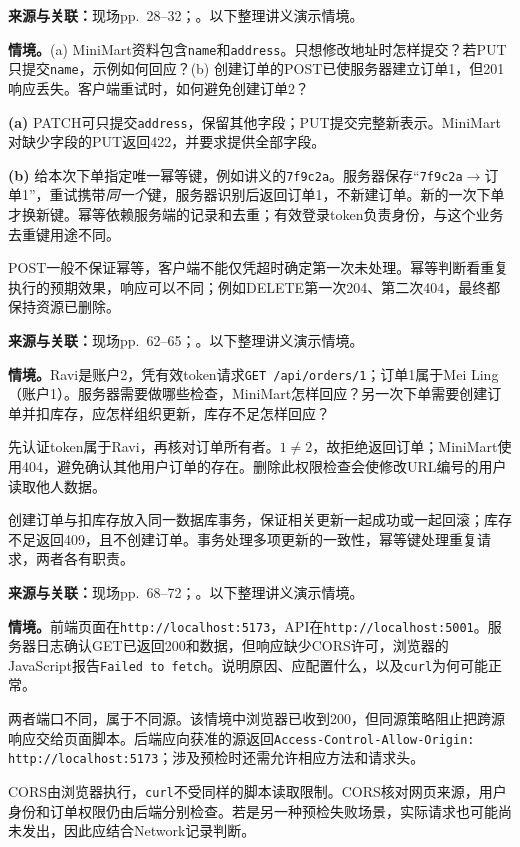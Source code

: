 
\textbf{来源与关联：}现场pp.~28--32；。以下整理讲义演示情境。

\textbf{情境。}(a) MiniMart资料包含\texttt{name}和\texttt{address}。只想修改地址时怎样提交？若PUT只提交\texttt{name}，示例如何回应？(b) 创建订单的POST已使服务器建立订单1，但201响应丢失。客户端重试时，如何避免创建订单2？

\begin{workedsolution}
\textbf{(a)} PATCH可只提交\texttt{address}，保留其他字段；PUT提交完整新表示。MiniMart对缺少字段的PUT返回422，并要求提供全部字段。

\textbf{(b)} 给本次下单指定唯一幂等键，例如讲义的\texttt{7f9c2a}。服务器保存“\texttt{7f9c2a}$\to$订单1”，重试携带\emph{同一个}键，服务器识别后返回订单1，不新建订单。新的一次下单才换新键。幂等依赖服务端的记录和去重；有效登录token负责身份，与这个业务去重键用途不同。

POST一般不保证幂等，客户端不能仅凭超时确定第一次未处理。幂等判断看重复执行的预期效果，响应可以不同；例如DELETE第一次204、第二次404，最终都保持资源已删除。
\end{workedsolution}


\textbf{来源与关联：}现场pp.~62--65；。以下整理讲义演示情境。

\textbf{情境。}Ravi是账户2，凭有效token请求\texttt{GET /api/orders/1}；订单1属于Mei Ling（账户1）。服务器需要做哪些检查，MiniMart怎样回应？另一次下单需要创建订单并扣库存，应怎样组织更新，库存不足怎样回应？

\begin{workedsolution}
先认证token属于Ravi，再核对订单所有者。$1\ne2$，故拒绝返回订单；MiniMart使用404，避免确认其他用户订单的存在。删除此权限检查会使修改URL编号的用户读取他人数据。

创建订单与扣库存放入同一数据库事务，保证相关更新一起成功或一起回滚；库存不足返回409，且不创建订单。事务处理多项更新的一致性，幂等键处理重复请求，两者各有职责。
\end{workedsolution}


\textbf{来源与关联：}现场pp.~68--72；。以下整理讲义演示情境。

\textbf{情境。}前端页面在\texttt{http://localhost:5173}，API在\texttt{http://localhost:5001}。服务器日志确认GET已返回200和数据，但响应缺少CORS许可，浏览器的JavaScript报告\texttt{Failed to fetch}。说明原因、应配置什么，以及\texttt{curl}为何可能正常。

\begin{workedsolution}
两者端口不同，属于不同源。该情境中浏览器已收到200，但同源策略阻止把跨源响应交给页面脚本。后端应向获准的源返回\texttt{Access-Control-Allow-Origin: http://localhost:5173}；涉及预检时还需允许相应方法和请求头。

CORS由浏览器执行，\texttt{curl}不受同样的脚本读取限制。CORS核对网页来源，用户身份和订单权限仍由后端分别检查。若是另一种预检失败场景，实际请求也可能尚未发出，因此应结合Network记录判断。
\end{workedsolution}
\endgroup
